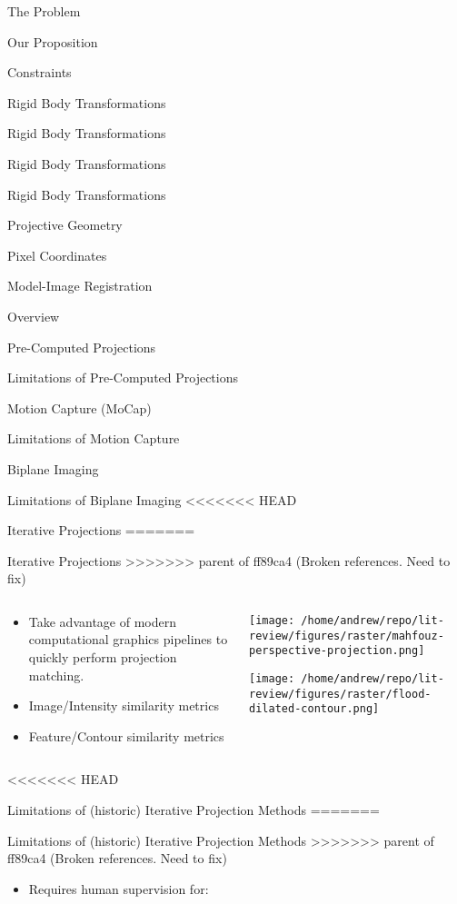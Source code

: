 \documentclass[presentation, aspectratio=1610]{beamer}
\begin{document}
\begin{frame}[label={sec:org51bdd62}]{The Problem}
\begin{frame}[label={sec:org827823c}]{Our Proposition}
\begin{frame}[label={sec:org8655799}]{Constraints}
\begin{frame}[label={sec:orgb624cd0}]{Rigid Body Transformations}
\begin{frame}[label={sec:org66cfa5c}]{Rigid Body Transformations}
\begin{frame}[label={sec:orga8040ec}]{Rigid Body Transformations}
\begin{frame}[label={sec:org2c45bb0}]{Rigid Body Transformations}
\begin{frame}[label={sec:orgc08b8a8}]{Projective Geometry}
\begin{frame}[label={sec:org9004faf}]{Pixel Coordinates}
\begin{frame}[label={sec:orgf5a9f37}]{Model-Image Registration}
\begin{frame}[label={sec:orgd132949}]{Overview}
\begin{frame}[label={sec:org3bacc15}]{Pre-Computed Projections}
\begin{frame}[label={sec:org9c71b5d}]{Limitations of Pre-Computed Projections}
\begin{frame}[label={sec:org0b4ee4b}]{Motion Capture (MoCap)}
\begin{frame}[label={sec:org8d150bb}]{Limitations of Motion Capture}
\begin{frame}[label={sec:orgb0b4d92}]{Biplane Imaging}
\begin{frame}[label={sec:org4d6375c}]{Limitations of Biplane Imaging}
<<<<<<< HEAD
\begin{frame}[label={sec:org2fdd7da}]{Iterative Projections}
=======
\begin{frame}[label={sec:orgbb46f10}]{Iterative Projections}
>>>>>>> parent of ff89ca4 (Broken references. Need to fix)
\begin{columns}
\begin{column}{0.5\columnwidth}
\begin{itemize}
\item Take advantage of modern computational graphics pipelines to quickly perform projection matching.
\item Image/Intensity similarity metrics \autocite{mahfouzRobustMethodRegistration2003}
\item Feature/Contour similarity metrics
\end{itemize}
\end{column}
\begin{column}{0.6\columnwidth}
\begin{center}
\texttt{[image: /home/andrew/repo/lit-review/figures/raster/mahfouz-perspective-projection.png]}
\end{center}
\begin{center}
\texttt{[image: /home/andrew/repo/lit-review/figures/raster/flood-dilated-contour.png]}
\end{center}
\end{column}
\end{columns}
\end{frame}
<<<<<<< HEAD
\begin{frame}[label={sec:org64525aa}]{Limitations of (historic) Iterative Projection Methods}
=======
\begin{frame}[label={sec:org04d16d4}]{Limitations of (historic) Iterative Projection Methods}
>>>>>>> parent of ff89ca4 (Broken references. Need to fix)
\begin{itemize}
\item Requires human supervision for:

\end{itemize}
\end{frame}
\end{frame}
\end{frame}
\end{frame}
\end{frame}
\end{frame}
\end{frame}
\end{frame}
\end{frame}
\end{frame}
\end{frame}
\end{frame}
\end{frame}
\end{frame}
\end{frame}
\end{frame}
\end{frame}
\end{frame}
\end{frame}
\end{frame}
\end{document}
